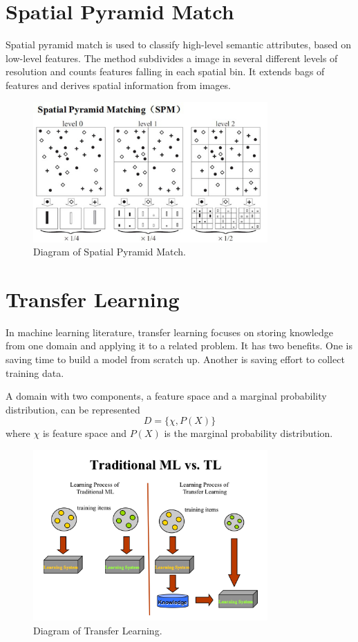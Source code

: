 \section{Spatial Pyramid Match}

Spatial pyramid match\citep{lazebnik2006beyond} is used to classify high-level semantic attributes, based on low-level features. The method subdivides a image in several different levels of resolution and counts features falling in each spatial bin. It extends bags of features and derives spatial information from images.
\graphicspath{ {./Figures/} }
\begin{figure}[!htb]
\centering
\includegraphics[width=0.8\textwidth]{spm.jpg}
\caption{\label{fig:perceptron}Diagram of Spatial Pyramid Match.}
\end{figure}

\section{Transfer Learning}

In machine learning literature, transfer learning\citep{pan2010survey} focuses on storing knowledge from one domain and applying it to a related problem. It has two benefits. One is saving time to build a model from scratch up. Another is saving effort to collect training data.

A domain with two components, a feature space and a marginal probability distribution, can be represented
\begin{equation}\label{eq:TransLearning}
D = \{ \chi, P(X) \}
\end{equation}
where $\chi$ is feature space and $P(X)$ is the marginal probability distribution. 
\graphicspath{ {./Figures/} }
\begin{figure}[!htb]
\centering
\includegraphics[width=0.8\textwidth]{MLvsTL.png}
\caption{\label{fig:perceptron}Diagram of Transfer Learning.}
\end{figure}
